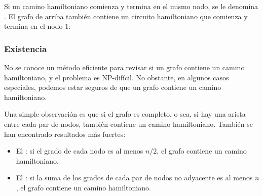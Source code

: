 Si un camino hamiltoniano comienza y termina en el mismo nodo, se le
denomina . El grafo de arriba también contiene
un circuito hamiltoniano que comienza y termina en el nodo 1:
\begin{center}
\end{center}

\subsubsection{Existencia}

No se conoce un método eficiente para revisar si un grafo contiene un
camino hamiltoniano, y el problema es NP-difícil. No obstante, en algunos
casos especiales, podemos estar seguros de que un grafo contiene un
camino hamiltoniano.

Una simple observación es que si el grafo es completo, o sea, si hay una
arista entre cada par de nodos, también contiene un camino hamiltoniano.
También se han encontrado resultados más fuertes:


\begin{itemize}
    \item El : si el grado de cada nodo es al menos
          $\displaystyle n/2$, el grafo contiene un camino hamiltoniano.
    \item El : si la suma de los grados de cada
          par de nodos no adyacente es al menos $n$, el grafo contiene un
          camino hamiltoniano.
\end{itemize}

